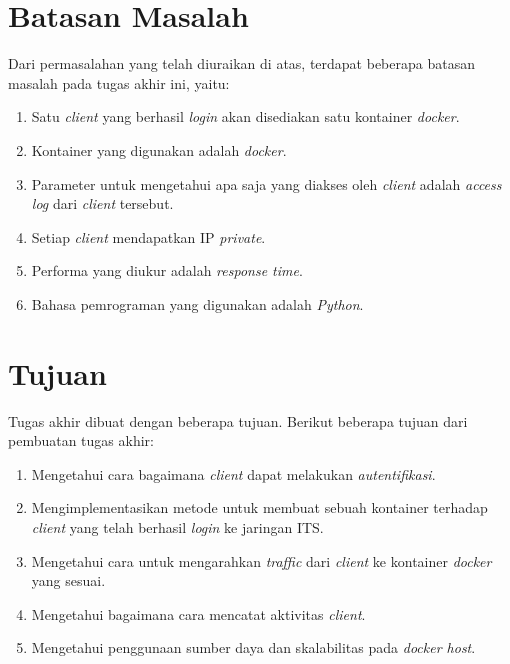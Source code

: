	\section{Batasan Masalah}
	 Dari permasalahan yang telah diuraikan di atas, terdapat beberapa batasan masalah pada tugas akhir ini, yaitu:
	\begin{enumerate}
     \item Satu \textit{client} yang berhasil \textit{login} akan disediakan satu kontainer \textit{docker}.
     \item Kontainer yang digunakan adalah \textit{docker}.
	 \item Parameter untuk mengetahui apa saja yang diakses oleh \textit{client} adalah \textit{access log} dari \textit{client} tersebut.
	 \item Setiap \textit{client} mendapatkan IP \textit{private}.
     \item Performa yang diukur adalah \textit{response time}.
     \item Bahasa pemrograman yang digunakan adalah \textit{Python}.
	\end{enumerate}
    
   \section{Tujuan}
	Tugas akhir dibuat dengan beberapa tujuan. Berikut beberapa tujuan dari pembuatan tugas akhir:
	\begin{enumerate}
	 \item Mengetahui cara bagaimana \textit{client} dapat melakukan \textit{autentifikasi}.
	 \item Mengimplementasikan metode untuk membuat sebuah kontainer terhadap \textit{client} yang telah berhasil \textit{login} ke jaringan ITS.
	 \item Mengetahui cara untuk mengarahkan \textit{traffic} dari \textit{client} ke kontainer \textit{docker} yang sesuai.
	 \item Mengetahui bagaimana cara mencatat aktivitas \textit{client}.
	 \item Mengetahui penggunaan sumber daya dan skalabilitas pada \textit{docker host}.
	\end{enumerate}
     
